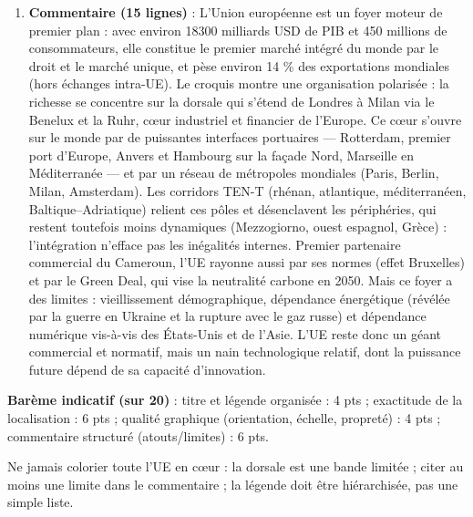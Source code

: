 \documentclass[11pt]{article}
\begin{document}
\begin{corrige}
\begin{enumerate}
\item \textbf{Commentaire (15 lignes)} : L'Union européenne est un foyer moteur de premier plan : avec environ \num{18300} milliards USD de PIB et 450 millions de consommateurs, elle constitue le premier marché intégré du monde par le droit et le marché unique, et pèse environ 14 \% des exportations mondiales (hors échanges intra-UE). Le croquis montre une organisation polarisée : la richesse se concentre sur la dorsale qui s'étend de Londres à Milan via le Benelux et la Ruhr, cœur industriel et financier de l'Europe. Ce cœur s'ouvre sur le monde par de puissantes interfaces portuaires — Rotterdam, premier port d'Europe, Anvers et Hambourg sur la façade Nord, Marseille en Méditerranée — et par un réseau de métropoles mondiales (Paris, Berlin, Milan, Amsterdam). Les corridors TEN-T (rhénan, atlantique, méditerranéen, Baltique--Adriatique) relient ces pôles et désenclavent les périphéries, qui restent toutefois moins dynamiques (Mezzogiorno, ouest espagnol, Grèce) : l'intégration n'efface pas les inégalités internes. Premier partenaire commercial du Cameroun, l'UE rayonne aussi par ses normes (effet Bruxelles) et par le Green Deal, qui vise la neutralité carbone en 2050. Mais ce foyer a des limites : vieillissement démographique, dépendance énergétique (révélée par la guerre en Ukraine et la rupture avec le gaz russe) et dépendance numérique vis-à-vis des États-Unis et de l'Asie. L'UE reste donc un géant commercial et normatif, mais un nain technologique relatif, dont la puissance future dépend de sa capacité d'innovation.
\end{enumerate}
\textbf{Barème indicatif (sur 20)} : titre et légende organisée : 4 pts ; exactitude de la localisation : 6 pts ; qualité graphique (orientation, échelle, propreté) : 4 pts ; commentaire structuré (atouts/limites) : 6 pts.
\begin{attention}
Ne jamais colorier toute l'UE en \og cœur \fg{} : la dorsale est une bande limitée ; citer au moins une limite dans le commentaire ; la légende doit être hiérarchisée, pas une simple liste.
\end{attention}
\end{corrige}
\end{document}
